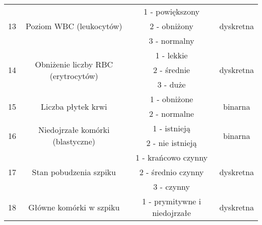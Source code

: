 \documentclass{article}
\begin{document}
\begin{center}
\begin{longtable}{ |c|c|c|c| }
\multirow{3}{*}{13} & \multirow{3}{*}{Poziom WBC (leukocytów)}            & 1 - powiększony                       & \multirow{3}{*}{dyskretna} \\
                    &                                                     & 2 - obniżony                          &                            \\
                    &                                                     & 3 - normalny                          &                            \\ \hline
\multirow{3}{*}{14} & \multirow{3}{*}{Obniżenie liczby RBC (erytrocytów)} & 1 - lekkie                            & \multirow{3}{*}{dyskretna} \\
                    &                                                     & 2 - średnie                           &                            \\
                    &                                                     & 3 - duże                              &                            \\ \hline
\multirow{2}{*}{15} & \multirow{2}{*}{Liczba płytek krwi}                 & 1 - obniżone                          & \multirow{2}{*}{binarna}   \\
                    &                                                     & 2 - normalne                          &                            \\ \hline
\multirow{2}{*}{16} & \multirow{2}{*}{Niedojrzałe komórki (blastyczne)}   & 1 - istnieją                          & \multirow{2}{*}{binarna}   \\
                    &                                                     & 2 - nie istnieją                      &                            \\ \hline
\multirow{3}{*}{17} & \multirow{3}{*}{Stan pobudzenia szpiku}             & 1 - krańcowo czynny                   & \multirow{3}{*}{dyskretna} \\
                    &                                                     & 2 - średnio czynny                    &                            \\
                    &                                                     & 3 - czynny                            &                            \\ \hline
\multirow{3}{*}{18} & \multirow{3}{*}{Główne komórki w szpiku}            & 1 - prymitywne i niedojrzałe          & \multirow{3}{*}{dyskretna} \\

\end{longtable}
\end{center}
\end{document}
